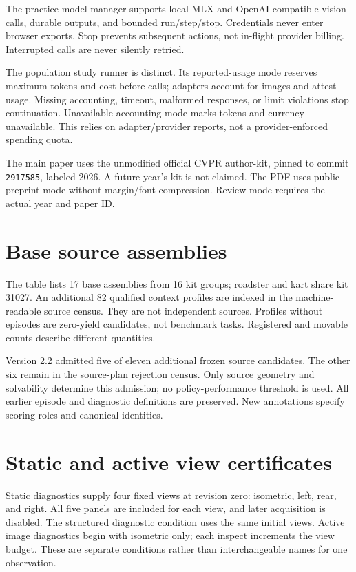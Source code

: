 The practice model manager supports local MLX and OpenAI-compatible
vision calls, durable outputs, and bounded run/step/stop. Credentials
never enter browser exports. Stop prevents subsequent actions, not
in-flight provider billing. Interrupted calls are never silently retried.

The population study runner is distinct. Its reported-usage mode reserves
maximum tokens and cost before calls; adapters account for images and
attest usage. Missing accounting, timeout, malformed responses, or limit
violations stop continuation. Unavailable-accounting mode marks tokens
and currency unavailable. This relies on adapter/provider reports, not
a provider-enforced spending quota.

The main paper uses the unmodified official CVPR author-kit, pinned to
commit \texttt{2917585}, labeled 2026. A future year's kit is not claimed.
The PDF uses public preprint mode without margin/font compression.
Review mode requires the actual year and paper ID.

\clearpage
\onecolumn
\section{Base source assemblies}
The table lists 17 base assemblies from 16 kit groups; roadster and kart
share kit 31027. An additional 82 qualified context profiles are indexed
in the machine-readable source census. They are not independent sources.
Profiles without episodes are zero-yield candidates, not benchmark tasks.
Registered and movable counts describe different quantities.
\begin{center}\small

\end{center}
\begin{center}\small

\end{center}
Version 2.2 admitted five of eleven additional frozen source candidates.
The other six remain in the source-plan rejection census. Only source
geometry and solvability determine this admission; no policy-performance
threshold is used. All earlier episode and diagnostic definitions are
preserved. New annotations specify scoring roles and canonical identities.

\section{Static and active view certificates}
Static diagnostics supply four fixed views at revision zero: isometric,
left, rear, and right. All five panels are included for each view, and
later acquisition is disabled. The structured diagnostic condition uses
the same initial views. Active image diagnostics begin with isometric
only; each inspect increments the view budget. These are separate
conditions rather than interchangeable names for one observation.

